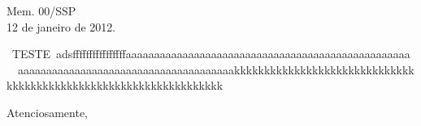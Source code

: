 \documentclass[12pt,a4paper]{article}
\begin{document}
	Mem. 00/SSP \\
	 12 de janeiro de 2012.
	
	\
	TESTE\
	adsffffffffffffffffaaaaaaaaaaaaaaaaaaaaaaaaaaaaaaaaaaaaaaaaaaaaaaaaaa \ \ 
aaaaaaaaaaaaaaaaaaaaaaaaaaaaaaaaaaaaaakkkkkkkkkkkkkkkkkkkkkkkkkkkkkkkkkkkkkkkkkkkkkkkkkkkkkkkkkkkkkkkkkk \ \ \
	
	\begin{center}
		Atenciosamente,\
		\
		\
	\end{center}
\end{document}
